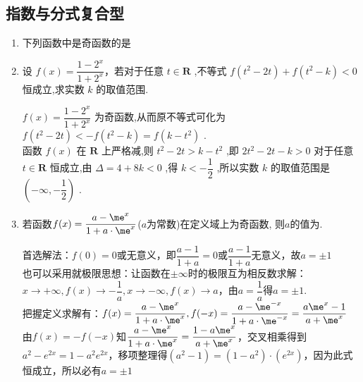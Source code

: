     \subsection*{指数与分式复合型}
    \begin{enumerate}  
    \item 下列函数中是奇函数的是
    \item 设 $f\left( x\right)  = \dfrac{1 - {2}^{x}}{1 + {2}^{x}}$，若对于任意 $t \in  \mathbf{R}$ ,不等式 $f\left( {{t}^{2} - {2t}}\right)  + f\left( {{t}^{2} - k}\right)  < 0$ 恒成立,求实数 $k$ 的取值范围.
    \begin{jieda}
        $f\left( x\right)  = \dfrac{1 - {2}^{x}}{1 + {2}^{x}}$ 为奇函数,从而原不等式可化为 $f\left( {{t}^{2} - {2t}}\right)  <  - f\left( {{t}^{2} - k}\right)  = f\left( {k - {t}^{2}}\right)$ . \\
        函数 $f\left( x\right)$ 在 $\mathbf{R}$ 上严格减,则 ${t}^{2} - {2t} > k - {t}^{2}$ ,即 $2{t}^{2} - {2t} - k > 0$ 对于任意 $t \in \mathbf{R}$ 恒成立,由 $\Delta  = 4 + {8k} < 0$ ,得 $k <  - \dfrac{1}{2}$ ,所以实数 $k$ 的取值范围是 $\left( {-\infty , - \dfrac{1}{2}}\right)$ .
        \end{jieda}
        \item 若函数$f(x)=\dfrac{a-\me^x}{1+a\cdot\me^x}$($a$为常数)在定义域上为奇函数, 则$a$的值为. 
        \begin{jieda}
        首选解法：$f(0)=0$或无意义，即$\dfrac{a-1}{1+a} = 0$或$\dfrac{a-1}{1+a}$无意义，故$a = \pm 1$\\
        也可以采用就极限思想：让函数在$\pm \infty$时的极限互为相反数求解：$x \rightarrow +\infty, f(x) \rightarrow -\dfrac{1}{a}, x \rightarrow -\infty, f(x) \rightarrow a$，由$a = \dfrac{1}{a}$得$a = \pm 1$. \\
        把握定义求解有：$f(x) = \dfrac{a-\me^x}{1+a\cdot\me^x}, f(-x) = \dfrac{a-\me^{-x}}{1+a\cdot\me^{-x}} = \dfrac{a\me^{x}-1}{a+\me^{x}}$ \\
        由$f(x) = -f(-x)$知$\dfrac{a-\me^x}{1+a\cdot\me^x} = \dfrac{1-a\me^{x}}{a+\me^{x}}$，交叉相乘得到$a^2 - e^{2x} = 1-a^2e^{2x}$，移项整理得$(a^2-1) = (1-a^2)\cdot(e^{2x})$，因为此式恒成立，所以必有$a = \pm 1$
        \end{jieda}
        

\end{enumerate}
